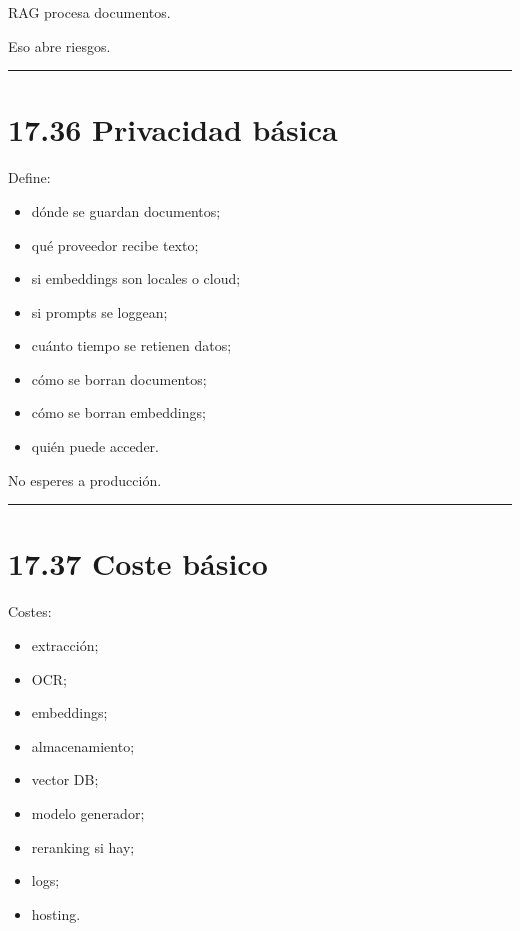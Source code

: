 RAG procesa documentos.

Eso abre riesgos.

\begin{center}\rule{0.5\linewidth}{0.5pt}\end{center}

\section{17.36 Privacidad básica}\label{privacidad-buxe1sica}

Define:

\begin{itemize}
\tightlist
\item
  dónde se guardan documentos;
\item
  qué proveedor recibe texto;
\item
  si embeddings son locales o cloud;
\item
  si prompts se loggean;
\item
  cuánto tiempo se retienen datos;
\item
  cómo se borran documentos;
\item
  cómo se borran embeddings;
\item
  quién puede acceder.
\end{itemize}

No esperes a producción.

\begin{center}\rule{0.5\linewidth}{0.5pt}\end{center}

\section{17.37 Coste básico}\label{coste-buxe1sico}

Costes:

\begin{itemize}
\tightlist
\item
  extracción;
\item
  OCR;
\item
  embeddings;
\item
  almacenamiento;
\item
  vector DB;
\item
  modelo generador;
\item
  reranking si hay;
\item
  logs;
\item
  hosting.
\end{itemize}

